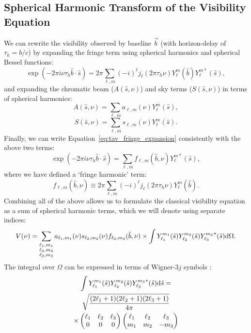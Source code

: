 \subsection{Spherical Harmonic Transform of the Visibility Equation}

We can rewrite the visibility observed by baseline $\vec{b}$ (with horizon-delay of $\tau_h = b/c$) by expanding the fringe term using spherical harmonics and spherical Bessel functions:
\begin{equation}
\exp\left(-2\pi i \nu \tau_h \hat{b}\cdot\hat{s}\right) = 2\pi \sum_{\ell, m} (-i)^{\ell} j_{\ell}(2\pi\tau_h\nu) Y^m_{\ell}(\hat{b}) Y^{m*}_{\ell}(\hat{s}),
\label{eq:tav_fringe_expansion}
\end{equation}
and expanding the chromatic beam ($A(\hat{s},\nu)$) and sky terms ($S(\hat{s},\nu)$) in terms of spherical harmonics:
\begin{equation}
A(\hat{s},\nu) = \sum_{\ell, m} a_{\ell, m}(\nu)Y^m_{\ell}(\hat{s}),
\end{equation} 
\begin{equation}
S(\hat{s},\nu) = \sum_{\ell, m} s_{\ell, m}(\nu)Y^m_{\ell}(\hat{s}).
\end{equation} 
Finally, we can write Equation~\ref{eq:tav_fringe_expansion} consistently with the above two terms:
\begin{equation}
\exp\left(-2\pi i \nu \tau_h \hat{b}\cdot\hat{s}\right) = \sum_{\ell, m} f_{\ell, m}(\hat{b},\nu) Y^{m*}_{\ell}(\hat{s}),
\end{equation}
where we have defined a `fringe harmonic' term:
\begin{equation}
f_{\ell, m}(\hat{b},\nu) \equiv 2\pi \sum_{\ell, m} (-i)^{\ell} j_{\ell}(2\pi\tau_h\nu) Y^m_{\ell}(\hat{b}).
\end{equation}
Combining all of the above allows us to formulate the classical visibility equation as a sum of spherical harmonic terms, which we will denote using separate indices:
\begin{equation}
V(\nu) = \sum_{\substack{\ell_1, m_1 \\ \ell_2, m_2 \\ \ell_3, m_3}} a_{\ell_1, m_1} (\nu) s_{\ell_2, m_2} (\nu) f_{\ell_3, m_3} (\hat{b}, \nu) \times \int Y_{\ell_1}^{m_1} (\hat{s}) Y_{\ell_2}^{m_2} (\hat{s}) {Y_{\ell_3}^{m_3}}^* (\hat{s}) {\rm d}\Omega.
\label{eq:vgeneral}
\end{equation}
The integral over $\Omega$ can be expressed in terms of  Wigner-$3j$ symbols \citep{Wigner.51}:
\begin{multline}
\int Y_{\ell_1}^{m_1} (\hat{s}) Y_{\ell_2}^{m_2} (\hat{s}) {Y_{\ell_3}^{m_3}}^* (\hat{s}) {\rm d}{\hat{s}} = \\
\sqrt{\frac{(2\ell_1 + 1)(2\ell_2 + 1)(2\ell_3 + 1)}{4\pi}} \\
\times \begin{pmatrix}
\ell_1 & \ell_2 & \ell_3 \\
0 & 0 & 0
\end{pmatrix}
\begin{pmatrix}
\ell_1 & \ell_2 & \ell_3 \\
m_1 & m_2 & -m_3
\end{pmatrix}
\end{multline}

